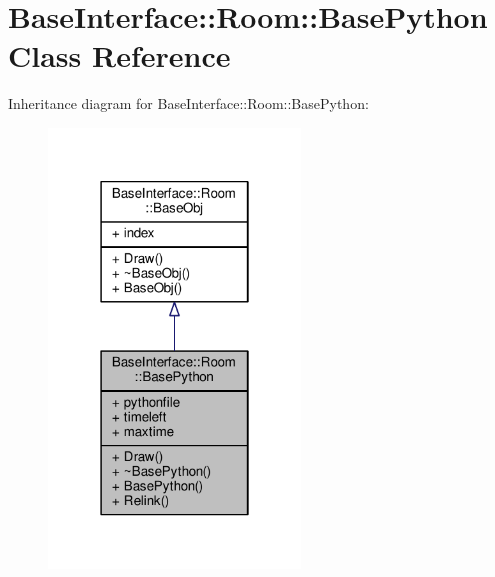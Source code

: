 \hypertarget{classBaseInterface_1_1Room_1_1BasePython}{}\section{Base\+Interface\+:\+:Room\+:\+:Base\+Python Class Reference}
\label{classBaseInterface_1_1Room_1_1BasePython}


Inheritance diagram for Base\+Interface\+:\+:Room\+:\+:Base\+Python\+:
\nopagebreak
\begin{figure}[H]
\begin{center}
\leavevmode
\includegraphics[width=190pt]{d4/dff/classBaseInterface_1_1Room_1_1BasePython__inherit__graph}
\end{center}
\end{figure}


